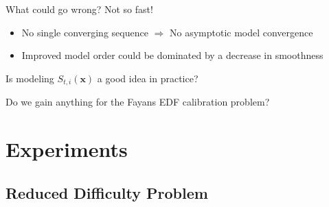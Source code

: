 \documentclass[aspectratio=169]{beamer}
\newcommand{\vx}{\mathbf{x}}
\begin{document}
\begin{frame}{What could go wrong?}
Not so fast!

\bigskip

\begin{itemize}
\item No single converging sequence $\Rightarrow$ No asymptotic model
convergence
\item Improved model order could be dominated by a decrease in smoothness
\end{itemize}

\bigskip

Is modeling $S_{t,i}(\vx)$ a good idea in practice?

Do we gain anything for the Fayans EDF calibration problem?
\end{frame}

\section{Experiments}
\subsection{Reduced Difficulty Problem}

\end{document}
